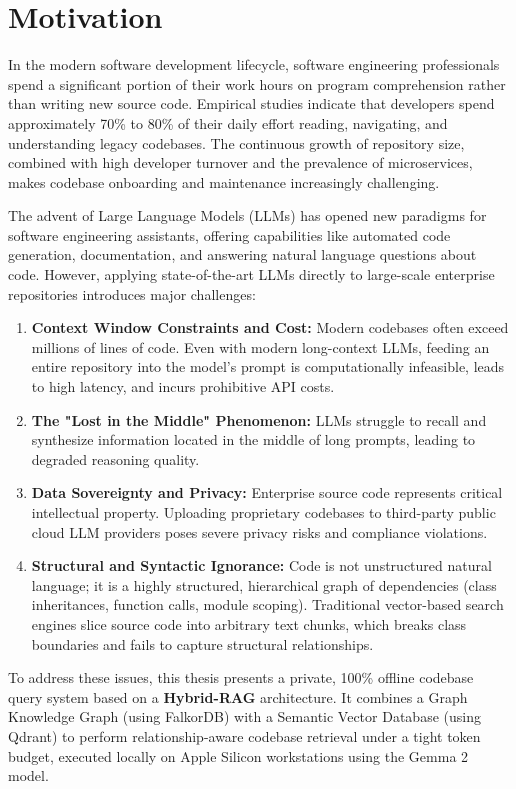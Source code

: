 \documentclass[12pt,a4paper,oneside]{report}
\begin{document}
\section{Motivation}
In the modern software development lifecycle, software engineering professionals spend a significant portion of their work hours on program comprehension rather than writing new source code. Empirical studies indicate that developers spend approximately 70\% to 80\% of their daily effort reading, navigating, and understanding legacy codebases. The continuous growth of repository size, combined with high developer turnover and the prevalence of microservices, makes codebase onboarding and maintenance increasingly challenging. 

The advent of Large Language Models (LLMs) has opened new paradigms for software engineering assistants, offering capabilities like automated code generation, documentation, and answering natural language questions about code. However, applying state-of-the-art LLMs directly to large-scale enterprise repositories introduces major challenges:
\begin{enumerate}
    \item \textbf{Context Window Constraints and Cost:} Modern codebases often exceed millions of lines of code. Even with modern long-context LLMs, feeding an entire repository into the model's prompt is computationally infeasible, leads to high latency, and incurs prohibitive API costs.
    \item \textbf{The "Lost in the Middle" Phenomenon:} LLMs struggle to recall and synthesize information located in the middle of long prompts, leading to degraded reasoning quality.
    \item \textbf{Data Sovereignty and Privacy:} Enterprise source code represents critical intellectual property. Uploading proprietary codebases to third-party public cloud LLM providers poses severe privacy risks and compliance violations.
    \item \textbf{Structural and Syntactic Ignorance:} Code is not unstructured natural language; it is a highly structured, hierarchical graph of dependencies (class inheritances, function calls, module scoping). Traditional vector-based search engines slice source code into arbitrary text chunks, which breaks class boundaries and fails to capture structural relationships.
\end{enumerate}

To address these issues, this thesis presents a private, 100\% offline codebase query system based on a \textbf{Hybrid-RAG} architecture. It combines a Graph Knowledge Graph (using FalkorDB) with a Semantic Vector Database (using Qdrant) to perform relationship-aware codebase retrieval under a tight token budget, executed locally on Apple Silicon workstations using the Gemma 2 model.
\end{document}
